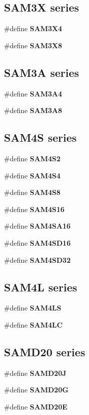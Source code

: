 \subsection*{S\+A\+M3\+X series}
\begin{DoxyCompactItemize}
\item 
\#define {\bfseries S\+A\+M3\+X4}
\item 
\#define {\bfseries S\+A\+M3\+X8}
\end{DoxyCompactItemize}
\subsection*{S\+A\+M3\+A series}
\begin{DoxyCompactItemize}
\item 
\#define {\bfseries S\+A\+M3\+A4}
\item 
\#define {\bfseries S\+A\+M3\+A8}
\end{DoxyCompactItemize}
\subsection*{S\+A\+M4\+S series}
\begin{DoxyCompactItemize}
\item 
\#define {\bfseries S\+A\+M4\+S2}
\item 
\#define {\bfseries S\+A\+M4\+S4}
\item 
\#define {\bfseries S\+A\+M4\+S8}
\item 
\#define {\bfseries S\+A\+M4\+S16}
\item 
\#define {\bfseries S\+A\+M4\+S\+A16}
\item 
\#define {\bfseries S\+A\+M4\+S\+D16}
\item 
\#define {\bfseries S\+A\+M4\+S\+D32}
\end{DoxyCompactItemize}
\subsection*{S\+A\+M4\+L series}
\begin{DoxyCompactItemize}
\item 
\#define {\bfseries S\+A\+M4\+L\+S}
\item 
\#define {\bfseries S\+A\+M4\+L\+C}
\end{DoxyCompactItemize}
\subsection*{S\+A\+M\+D20 series}
\begin{DoxyCompactItemize}
\item 
\#define {\bfseries S\+A\+M\+D20\+J}
\item 
\#define {\bfseries S\+A\+M\+D20\+G}
\item 
\#define {\bfseries S\+A\+M\+D20\+E}
\end{DoxyCompactItemize}
